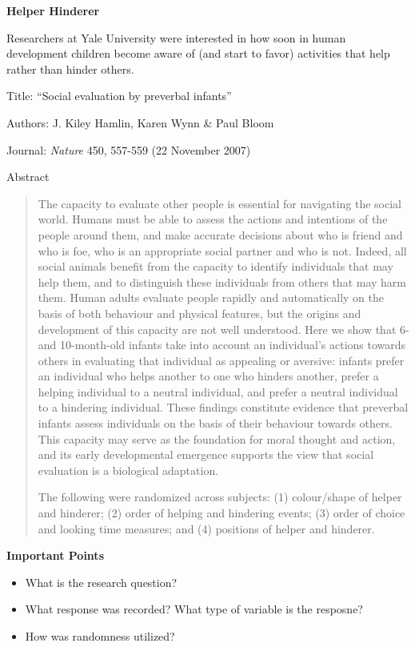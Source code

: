 \def\theTopic{Reading 3}

\begin{center}
{\bf {\large Helper Hinderer}}
\end{center}

Researchers at Yale University were interested in how soon in human
development children become aware of (and start to favor) activities
that help rather than hinder others.


Title: ``Social evaluation by preverbal infants''

Authors: J. Kiley Hamlin, Karen Wynn \& Paul Bloom

Journal: {\it Nature} 450, 557-559 (22 November 2007) 

Abstract

\begin{quotation}
  The capacity to evaluate other people is essential for navigating the
social world. Humans must be able to assess the actions and intentions
of the people around them, and make accurate decisions about who is
friend and who is foe, who is an appropriate social partner and who is
not. Indeed, all social animals benefit from the capacity to identify
individuals  that may help them, and to distinguish these
individuals from others that may harm them. Human adults evaluate
people rapidly and automatically on the basis of both behaviour and
physical features, but the origins and
development of this capacity are not well understood. Here we show
that 6- and 10-month-old infants take into account an individual's
actions towards others in evaluating that individual as appealing or
aversive: infants prefer an individual who helps another to one who
hinders another, prefer a helping individual to a neutral individual,
and prefer a neutral individual to a hindering individual. These
findings constitute evidence that preverbal infants assess individuals
on the basis of their behaviour towards others. This capacity may
serve as the foundation for moral thought and action, and its early
developmental emergence supports the view that social evaluation is a
biological adaptation. 



The following were randomized across subjects:
(1) colour/shape of helper and hinderer; (2) order of helping and
hindering events; (3) order of choice and looking time
measures; and (4) positions of helper and hinderer. 
\end{quotation}

\newpage

 \begin{center}
   {\large\bf Important Points}
 \end{center}
 \begin{itemize}
 \item What is the research question?\vspace{1in}
 \item What response was recorded? What type of variable is the
   resposne? \vspace{1in}
 \item How was randomness utilized?\vspace{1in}

 \end{itemize}




